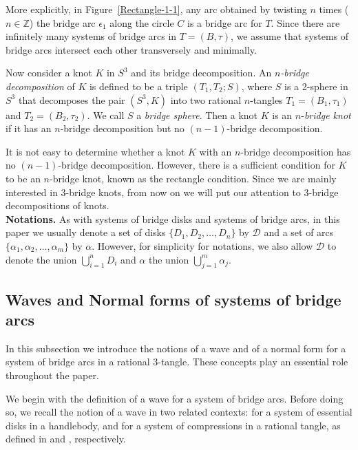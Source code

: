 \documentclass[12pt]{amsart}
\newcommand{\al}{\alpha}
\newcommand{\ep}{\epsilon}
\begin{document}
More explicitly, in Figure~\ref{Rectangle-1-1}, any arc obtained by twisting $n$ times ($n\in \mathbb{Z}$) the bridge arc $\ep_1$ along the circle $C$ is a bridge arc for $T$. Since there are infinitely many systems of bridge arcs in $T=(B, \tau)$, we assume that systems of bridge arcs intersect each other transversely and minimally.

Now consider a knot $K$ in $S^3$ and its bridge decomposition. An $n$\textit{-bridge decomposition} of $K$ is defined to be a triple $(T_1, T_2;S)$, where $S$ is a 2-sphere in $S^3$ that decomposes the pair $(S^3, K)$ into two rational $n$-tangles $T_1=(B_1, \tau_1)$ and $T_2=(B_2, \tau_2)$. We call $S$ a \textit{bridge sphere}. Then a knot $K$ is an $n$-\textit{bridge knot} if it has an $n$-bridge decomposition but no $(n-1)$-bridge decomposition.


It is not easy to determine whether a knot $K$ with an $n$-bridge decomposition has no $(n-1)$-bridge decomposition.
However, there is a sufficient condition for $K$ to be an $n$-bridge knot, known as the rectangle condition.
Since we are mainly interested in 3-bridge knots, from now on we will put our attention to 3-bridge decompositions of knots.\\

\textbf{Notations.} As with systems of bridge disks and systems of bridge arcs, in this paper we usually denote a set of disks $\{D_1, D_2, \ldots, D_n\}$ by $\mathcal{D}$ and a set of arcs $\{\al_1, \al_2, \ldots, \al_m\}$ by $\al$. However, for simplicity for notations, we also allow $\mathcal{D}$ to denote the union $\bigcup_{i=1}^n D_i$ and $\al$ the union $\bigcup_{j=1}^m \al_j$. \\


\subsection{Waves and Normal forms of systems of bridge arcs}\label{B2-2}\hfill

In this subsection we introduce the notions of a wave and of a normal form for a system of bridge arcs in a rational 3-tangle.
These concepts play an essential role throughout the paper.

We begin with the definition of a wave for a system of bridge arcs. Before doing so, we recall the notion of a wave in two related contexts: for a system of essential disks in a handlebody, and for a system of compressions in a rational tangle, as defined in \cite{KL12} and \cite{K20}, respectively.
\end{document}
